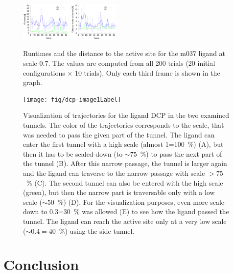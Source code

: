 \documentclass[usletter, 10pt, conference]{ieeeconf} %
\begin{document}
{\def\a{0}
\begin{figure}[t]
\centering
\includegraphics[width=0.22\textwidth,angle=\a]{fig/crop3}
\includegraphics[width=0.22\textwidth,angle=\a]{fig/crop4}
\caption{\label{fig::comparison}
    \small
    Runtimes and the distance to the active site for the m037 ligand at scale 0.7.
    The values are computed from all 200 trials (20 initial configurations $\times$ 10 trials).
    Only each third frame is shown in the graph.
}
\end{figure}
}




\begin{figure}
\centering
\vskip -5pt
\texttt{[image: fig/dcp-image1Label]}\\
\vspace{-5pt}
\caption{\label{fig::dcp}
    \small
Visualization of trajectories for the ligand DCP in the two examined tunnels.  
The color of the trajectories corresponds to the scale, that was needed to pass the given part of the tunnel.
The ligand can enter the first tunnel with a high scale (almost 1=100~\%) (A), but then it has to be scaled-down (to $\sim75$~\%) to pass the
next part of the tunnel (B). After this narrow passage, the tunnel is larger again and the ligand can traverse to the narrow passage with
scale $>75$~\% (C).
The second tunnel can also be entered with the high scale (green), but then the narrow part is traversable only with a low scale ($\sim50$~\%) (D). 
For the visualization purposes, even more scale-down to 0.3=30~\% was allowed (E) to see how the ligand passed the tunnel.
The ligand can reach the active site only at a very low scale ($\sim0.4=40$~\%) using the side tunnel.
}
\end{figure}


\section{Conclusion}
\end{document}
